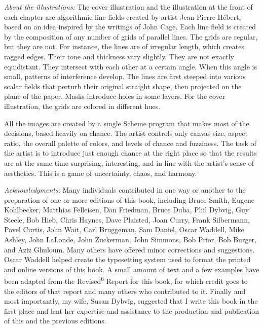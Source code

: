 \textit{About the illustrations:}
The cover illustration and the illustration at the front of each chapter
are algorithmic line fields created by artist Jean-Pierre Hébert, based
on an idea inspired by the writings of John Cage.
Each line field is created by the composition of any number of grids of
parallel lines.
The grids are regular, but they are not.
For instance, the lines are of irregular length, which creates ragged
edges.
Their tone and thickness vary slightly.
They are not exactly equidistant.
They intersect with each other at a certain angle. 
When this angle is small, patterns of interference develop.
The lines are first steeped into various scalar fields that perturb their
original straight shape, then projected on the plane of the paper.
Masks introduce holes in some layers. 
For the cover illustration, the grids are colored in different hues.


All the images are created by a single Scheme program that makes most of
the decisions, based heavily on chance.
The artist controls only canvas size, aspect ratio, the overall palette of
colors, and levels of chance and fuzziness. 
The task of the artist is to introduce just enough chance at the right
place so that the results are at the same time surprising, interesting,
and in line with the artist's sense of aesthetics. 
This is a game of uncertainty, chaos, and harmony.


\textit{Acknowledgments:}
Many individuals contributed in one way
or another to the preparation of one or more editions
of this book, including
Bruce Smith,
Eugene Kohlbecker,
Matthias Felleisen,
Dan Friedman,
Bruce Duba,
Phil Dybvig,
Guy Steele,
Bob Hieb,
Chris Haynes,
Dave Plaisted,
Joan Curry,
Frank Silbermann,
Pavel Curtis,
John Wait,
Carl Bruggeman,
Sam Daniel,
Oscar Waddell,
Mike Ashley,
John LaLonde,
John Zuckerman,
John Simmons,
Bob Prior,
Bob Burger,
and
Aziz Ghuloum.
Many others have offered minor corrections and suggestions.
Oscar Waddell helped create the typesetting system used to
format the printed and online versions of this book.
A small amount of text and a few examples have been adapted from
the Revised\textsuperscript{6} Report for this book, for which credit goes to the
editors of that report and many others who contributed to it.
Finally and most importantly, my wife, Susan Dybvig, suggested that
I write this book in the first place and lent her expertise and
assistance to the production and publication of this and the
previous editions.


